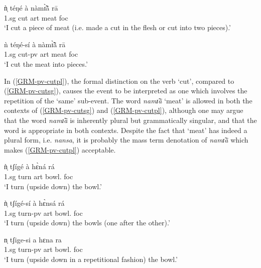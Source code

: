 \begin{exe}
\begin{exe}
\begin{exe}
{\begin{exe}
\begin{exe}
\begin{exe}
\begin{exe}
\begin{exe}
\begin{exe}
\begin{exe}
\begin{xlist}
\begin{exe}
\begin{exe}
\begin{exe}
\begin{exe}
\begin{exe}
\begin{exe}
\begin{exe}
\begin{exe}
\begin{exe}
\begin{exe}
\begin{exe}
\begin{exe}
\begin{exe}
\begin{exe}
\begin{exe}
\ea\label{ex:GRM-pv-cut}
  
    \ea\label{GRM-pv-cutsg}
\gll   ǹ̩  téŋé  à nàmɪ̃̀ã̀  rā  \\
       {\sc 1.sg} {cut}  {\sc art} {meat} {\sc foc}\\
\glt `I cut a piece of meat (i.e.  made a cut in the flesh or cut into two
pieces).'

\ex\label{GRM-pv-cutpl}
\gll    ǹ    téŋé-sí  à nàmɪ̃̀ã̀  rā \\
          {\sc 1.sg} {cut-{\sc pv}} {\sc art} {meat} {\sc foc}\\
\glt `I cut the meat into pieces.'

 
\z 
 \z

In  (\ref{GRM-pv-cutpl}),  the formal distinction on the verb `cut',  compared
to (\ref{GRM-pv-cutsg}),  causes  the event to be interpreted as one which
involves the repetition of the `same'  sub-event.  The word {\it namɪ̃ã} `meat'
is allowed in both the contexts of (\ref{GRM-pv-cutsg}) and
(\ref{GRM-pv-cutpl}), although one may argue that the word {\it namɪ̃ã} is
inherently
plural but grammatically singular,  and that the word is appropriate in both
contexts. Despite the fact that  `meat' has indeed a plural form, i.e. {\it 
nansa}, it is probably the mass term denotation of {\it namɪ̃ã} which 
makes (\ref{GRM-pv-cutpl}) acceptable. 


\ea\label{GRM-pv-turn}
  
    \ea\label{GRM-pv-turnsg}
\gll   ǹ̩  tʃígé  à  hɛ̀ná  rá  \\
        {\sc 1.sg} {turn} {\sc art} {bowl.\sg} {\sc foc}\\
\glt `I turn (upside down) the bowl.'

 \ex\label{GRM-pv-turnpl1}
\gll   ǹ̩  tʃígé-sí  à  hɛ̀nsá  rá   \\
         {\sc 1.sg}   {turn-{\sc pv}} {\sc art} {bowl.\pl} {\sc foc}\\
\glt `I turn (upside down) the bowls (one after the other).'


 \ex\label{GRM-pv-turnpl2}
  n̩  tʃige-si   a  hɛna  ra \\
       {}  {\sc 1.sg}    {turn-{\sc pv}} {\sc art}  {bowl.\sg}  {\sc foc}\\
\glt `I turn (upside down in a repetitional fashion) the bowl.'

\z 
 \z


\end{exe}
\end{exe}
\end{exe}
\end{exe}
\end{exe}
\end{exe}
\end{exe}
\end{exe}
\end{exe}
\end{exe}
\end{exe}
\end{exe}
\end{exe}
\end{exe}
\end{exe}
\end{xlist}
\end{exe}
\end{exe}
\end{exe}
\end{exe}
\end{exe}
\end{exe}
\end{exe}}
\end{exe}
\end{exe}
\end{exe}
